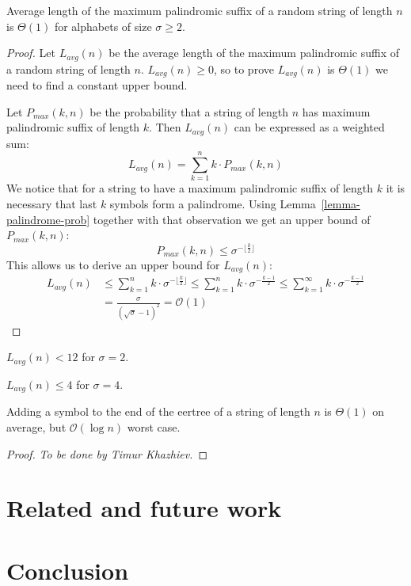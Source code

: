 \begin{theorem}
  Average length of the maximum palindromic suffix
  of a random string of length $n$ is $\Theta(1)$
  for alphabets of size $\sigma \ge 2$.
\end{theorem}
\begin{proof}
  Let $L_{avg}(n)$ be the average length of the maximum palindromic suffix
  of a random string of length $n$.
  $L_{avg}(n) \ge 0$, so to prove $L_{avg}(n)$ is $\Theta(1)$ we need
  to find a constant upper bound.

  Let $P_{max}(k, n)$ be the probability that a string of length $n$
  has maximum palindromic suffix of length $k$.
  Then $L_{avg}(n)$ can be expressed as a weighted sum:
  \[
  L_{avg}(n) = \sum_{k=1}^{n} k \cdot P_{max}(k, n)
  \]
  We notice that for a string to have a maximum palindromic suffix
  of length $k$ it is necessary that last $k$ symbols form a palindrome.
  Using Lemma~\ref{lemma-palindrome-prob} together with that observation
  we get an upper bound of $P_{max}(k, n)$:
  \[
  P_{max}(k, n) \le \sigma^{- \lfloor\frac{k}{2}\rfloor}
  \]
  This allows us to derive an upper bound for $L_{avg}(n)$:
  \begin{align*}
    L_{avg}(n)
      &\le \sum_{k=1}^{n} k \cdot \sigma^{- \lfloor\frac{k}{2}\rfloor}
       \le \sum_{k=1}^{n} k \cdot \sigma^{- \frac{k-1}{2}}
       \le \sum_{k=1}^{\infty} k \cdot \sigma^{- \frac{k-1}{2}} \\
      &= \frac{\sigma}{(\sqrt{\sigma} - 1)^2}
       = \mathcal{O}(1)
  \end{align*}
\end{proof}

\begin{corollary}
  $L_{avg}(n) < 12$ for $\sigma = 2$.
\end{corollary}

\begin{corollary}
  $L_{avg}(n) \le 4$ for $\sigma = 4$.
\end{corollary}

\begin{theorem}
  Adding a symbol to the end of the eertree of
  a string of length $n$ is $\Theta(1)$ on average,
  but $\mathcal{O}(\log{}n)$ worst case.
\end{theorem}
\begin{proof}
  \emph{To be done by Timur Khazhiev.}
\end{proof}

\section{Related and future work}

\section{Conclusion}


